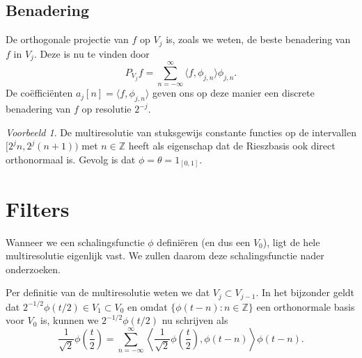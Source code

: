 \documentclass[11pt]{report}
\newcommand{\Z}{\mathbb{Z}}
\theoremstyle{plain}
\theoremstyle{remark}
\newtheorem*{voorbeeld}{Voorbeeld}
\begin{document}
\subsection{Benadering} De orthogonale projectie van $f$ op $V_j$ is, zoals we weten, de beste benadering van $f$ in $V_j$. Deze is nu te vinden door
\[
	P_{V_j} f = \sum_{n=-\infty}^\infty \langle f, \phi_{j,n} \rangle \phi_{j,n}.
\]
De co\"effici\"enten $a_j[n] = \langle f, \phi_{j,n} \rangle$ geven ons op deze manier een discrete benadering van $f$ op resolutie $2^{-j}$.

\begin{voorbeeld}
  De multiresolutie van stuksgewijs constante functies op de intervallen $[2^jn, 2^j(n+1))$ met $n \in \Z$ heeft als eigenschap dat de Rieszbasis ook direct orthonormaal is. Gevolg is dat $\phi = \theta = 1_{[0,1]}$.
\end{voorbeeld}

\section{Filters}
Wanneer we een schalingsfunctie $\phi$ defini\"eren (en dus een $V_0$), ligt de hele multiresolutie eigenlijk vast. We zullen daarom deze schalingsfunctie nader onderzoeken.

Per definitie van de multiresolutie weten we dat $V_j \subset V_{j-1}$. In het bijzonder geldt dat $2^{-1/2}\phi(t/2) \in V_1 \subset V_0$ en omdat $\{ \phi(t-n): n \in \Z\}$ een orthonormale basis voor $V_0$ is, kunnen we $2^{-1/2} \phi(t/2)$ nu schrijven als
\[
  \frac{1}{\sqrt{2}} \phi\left(\frac{t}{2}\right) = \sum_{n=-\infty}^{\infty} \left\langle \frac{1}{\sqrt{2}} \phi\left(\frac{t}{2}\right), \phi(t-n) \right\rangle \phi(t-n).
\]
\end{document}
